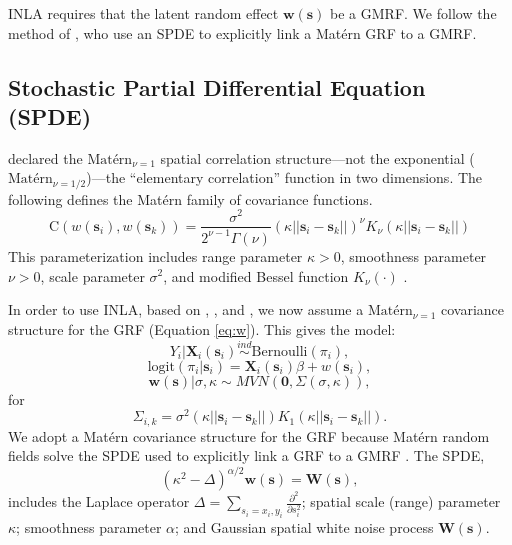INLA requires that the latent random effect $\pmb{w}(\pmb{s})$ be a GMRF. We follow the method of \cite{Lindgren2011}, who use an SPDE to explicitly link a Mat\'ern GRF to a GMRF. 

\subsection{Stochastic Partial Differential Equation (SPDE)} \label{SPDE}

\cite{Whittle1954} declared the $\text{Mat\'ern}_{\nu = 1}$ spatial correlation structure---not the exponential ($\text{Mat\'ern}_{\nu = 1/2}$)---the ``elementary correlation'' function in two dimensions. The following defines the Mat\'ern family of covariance functions.
$$\text{C}\left(w(\pmb{s}_{i}), w(\pmb{s}_{k}) \right)= \frac{\sigma^{2}}{2^{\nu - 1}\Gamma(\nu)}(\kappa ||\pmb{s}_{i} - \pmb{s}_{k}||)^{\nu}K_{\nu}(\kappa ||\pmb{s}_{i} - \pmb{s}_{k}||)$$
This parameterization includes range parameter $\kappa > 0$, smoothness parameter $\nu > 0$, scale parameter $\sigma^{2}$, and modified Bessel function $K_{\nu}(\cdot)$ \citep{Schabenberger2004}.

In order to use INLA, based on \cite{Whittle1954}, \cite{Mondal2017}, and \cite{Lindgren2015}, we now assume a $\text{Mat\'ern}_{\nu = 1}$ covariance structure for the GRF (Equation \ref{eq:w}). This gives the model:
$$ Y_{i}|\mathbf{X}_{i}(\mathbf{s}_{i}) \stackrel{ind}{\sim} \mbox{Bernoulli}(\pi_{i}), $$
$$ \text{logit}(\pi_{i}|\pmb{s}_{i}) = \mathbf{X}_{i}(\mathbf{s}_{i})\beta + w(\pmb{s}_{i}), $$
$$ \pmb{w}(\pmb{s}) | \sigma, \kappa \sim MVN(\pmb{0}, \Sigma(\sigma, \kappa)), $$
for
\begin{equation}
\Sigma_{i,k} = \sigma^{2}(\kappa ||\pmb{s}_{i} - \pmb{s}_{k}||)K_{1}(\kappa ||\pmb{s}_{i} - \pmb{s}_{k}||).
\end{equation}
We adopt a Mat\'ern covariance structure for the GRF because  Mat\'ern random fields solve the SPDE used to explicitly link a GRF to a GMRF \citep{Whittle1954}. The SPDE,
\begin{equation} \label{eq:spde1}
(\kappa^{2} - \Delta)^{\alpha/2}\pmb{w}(\pmb{s}) = \pmb{W}(\pmb{s}),
\end{equation}
includes the Laplace operator $\Delta = \sum_{s_{i}=x_{i},y_{i}} \frac{\partial^{2}}{\partial s_{i}^{2}}$; spatial scale (range) parameter $\kappa$; smoothness parameter $\alpha$; and Gaussian spatial white noise process $\pmb{W}(\pmb{s})$. 

